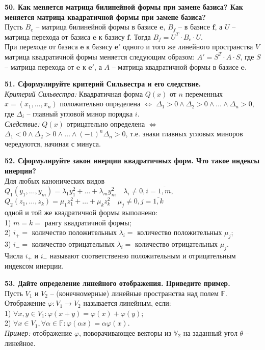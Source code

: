 \documentclass[11pt,a4paper]{article}
\newcommand{\F}{\mathbb{F}}
\newcommand{\e}{\mathbf{e}}
\newcommand{\eprime}{\mathbf{e'}}
\renewcommand{\f}{\mathbf{f}}
\begin{document}
\textbf{50. Как меняется матрица билинейной формы при замене базиса? Как меняется матрица квадратичной формы при замене базиса?\\}
Пусть $B_e$ -- матрица билинейной формы в базисе $\e$, $B_f$ -- в базисе $\f$, а $U$ -- матрица перехода от базиса $\e$ к базису $\f$. Тогда $B_f = U^T \cdot B_e \cdot U$.\\
При переходе от базиса $\e$ к базису $\eprime$ одного и того же линейного пространства $V$ матрица квадратичной формы меняется следующим образом: $A' = S^T \cdot A \cdot S$, где $S$ -- матрица перехода от $\e$ к $\eprime$, а $A$ -- матрица квадратичной формы в базисе $\e$.

\textbf{51. Сформулируйте критерий Сильвестра и его следствие.\\}
\textit{Критерий Сильвестра:} Квадратичная форма $Q(x)$ от $n$ переменных $x = (x_1, \hdots, x_n)$ положительно определена $\Leftrightarrow$ $\Delta_1 > 0 \wedge \Delta_2 > 0 \wedge \hdots \wedge \Delta_n > 0$, где $\Delta_i$ -- главный угловой минор порядка $i$.\\
\textit{Следствие:} $Q(x)$ отрицательно определена $\Leftrightarrow$ $\Delta_1 < 0 \wedge \Delta_2 > 0 \wedge \hdots \wedge (-1)^n \Delta_n > 0$, т.е. знаки главных угловых миноров чередуются, начиная с минуса.

\textbf{52. Сформулируйте закон инерции квадратичных форм. Что такое индексы инерции?\\}
Для любых канонических видов\\
$Q_1(y_1, \hdots, y_m) = \lambda_1 y_1^2 + \hdots + \lambda_m y_m^2 \quad \lambda_i \neq 0, i = \overline{1, m}$,\\
$Q_2(z_1, \hdots, z_k) = \mu_1 z_1^2 + \hdots + \mu_k z_k^2 \quad \mu_j \neq 0, j = \overline{1, k}$\\
одной и той же квадратичной формы выполнено:\\
1) $m = k =$ рангу квадратичной формы;\\
2) $i_+ =$ количество положительных $\lambda_i =$ количество положительных $\mu_j$;\\
3) $i_- =$ количество отрицательных $\lambda_i =$ количество отрицательных $\mu_j$.\\
Числа $i_+$ и $i_-$ называют соответственно положительным и отрицательным индексом инерции.

\textbf{53. Дайте определение линейного отображения. Приведите пример.\\}
Пусть $V_1$ и $V_2$ -- (конечномерные) линейные пространства над полем $\F$. Отображение $\varphi : V_1 \rightarrow V_2$ называется линейным, если:\\
1) $\forall x, y \in V_1: \varphi (x + y) = \varphi (x) + \varphi (y)$;\\
2) $\forall x \in V_1, \forall \alpha \in \F: \varphi (\alpha x) = \alpha \varphi (x).$\\
\textit{Пример:} отображение $\varphi$, поворачивающее векторы из $\mathbb{V}_2$ на заданный угол $\theta$ -- линейное.
\end{document}
